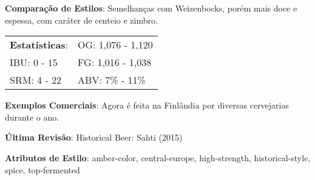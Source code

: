 \textbf{Comparação de Estilos}: Semelhanças com Weizenbocks, porém mais doce e espessa, com caráter de centeio e zimbro.

\begin{tabular}{@{}p{35mm}p{35mm}@{}}
  \textbf{Estatísticas}: & OG: 1,076 - 1,120 \\
  IBU: 0 - 15  & FG: 1,016 - 1,038  \\
  SRM: 4 - 22 & ABV: 7\% - 11\%
\end{tabular}

\textbf{Exemplos Comerciais}: Agora é feita na Finlândia por diversas cervejarias durante o ano.

\textbf{Última Revisão}: Historical Beer: Sahti (2015)

\textbf{Atributos de Estilo}: amber-color, central-europe, high-strength, historical-style, spice, top-fermented
